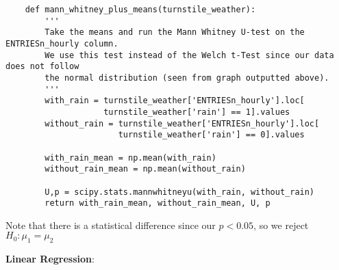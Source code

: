\documentclass[11pt, a4paper]{article}
\begin{document}
\begin{spacing}{1.1}
\begin{lstlisting}
	def mann_whitney_plus_means(turnstile_weather):
		'''
		Take the means and run the Mann Whitney U-test on the ENTRIESn_hourly column.
		We use this test instead of the Welch t-Test since our data does not follow
		the normal distribution (seen from graph outputted above).
		'''
		with_rain = turnstile_weather['ENTRIESn_hourly'].loc[
		            turnstile_weather['rain'] == 1].values
		without_rain = turnstile_weather['ENTRIESn_hourly'].loc[
		               turnstile_weather['rain'] == 0].values
		               
		with_rain_mean = np.mean(with_rain)
		without_rain_mean = np.mean(without_rain)
		
		U,p = scipy.stats.mannwhitneyu(with_rain, without_rain)
		return with_rain_mean, without_rain_mean, U, p \end{lstlisting} \vspace*{1mm}
	Note that there is a statistical difference since our $p < 0.05$, so we reject $H_0: \mu_1 = \mu_2$ \newpage

	\noindent \textbf{Linear Regression}:
	\begin{lstlisting}
	
	
	
	\end{lstlisting} 
	
	
	
	
	
\end{spacing}
\end{document}
